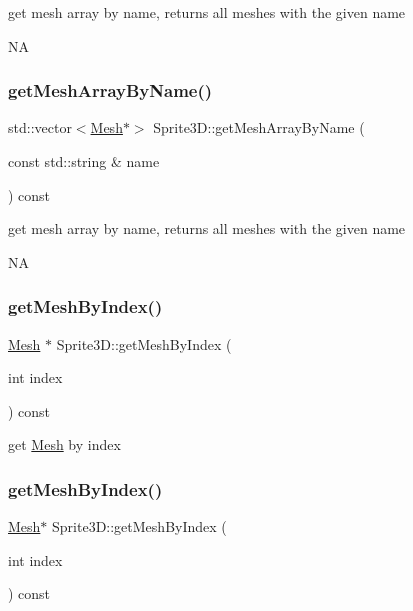 get mesh array by name, returns all meshes with the given name

NA \mbox{\label{classSprite3D_a5e23abd1b0979b3a8e90b2028ab1c5e7}} 
\subsubsection{\texorpdfstring{get\+Mesh\+Array\+By\+Name()}{getMeshArrayByName()}\hspace{0.1cm}{\footnotesize\ttfamily [2/2]}}
{\footnotesize\ttfamily std\+::vector$<$\hyperlink{classMesh}{Mesh}$\ast$$>$ Sprite3\+D\+::get\+Mesh\+Array\+By\+Name (\begin{DoxyParamCaption}\item[{const std\+::string \&}]{name }\end{DoxyParamCaption}) const}

get mesh array by name, returns all meshes with the given name

NA \mbox{\label{classSprite3D_ad76b814ad82566849ccbf5e534157aa4}} 
\subsubsection{\texorpdfstring{get\+Mesh\+By\+Index()}{getMeshByIndex()}\hspace{0.1cm}{\footnotesize\ttfamily [1/2]}}
{\footnotesize\ttfamily \hyperlink{classMesh}{Mesh} $\ast$ Sprite3\+D\+::get\+Mesh\+By\+Index (\begin{DoxyParamCaption}\item[{int}]{index }\end{DoxyParamCaption}) const}

get \hyperlink{classMesh}{Mesh} by index \mbox{\label{classSprite3D_aec899f921445251fc0011a5bc31c1b2d}} 
\subsubsection{\texorpdfstring{get\+Mesh\+By\+Index()}{getMeshByIndex()}\hspace{0.1cm}{\footnotesize\ttfamily [2/2]}}
{\footnotesize\ttfamily \hyperlink{classMesh}{Mesh}$\ast$ Sprite3\+D\+::get\+Mesh\+By\+Index (\begin{DoxyParamCaption}\item[{int}]{index }\end{DoxyParamCaption}) const}

